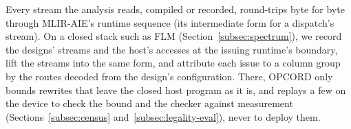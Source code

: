 \label{subsec:closed}
Every stream the analysis reads, compiled or recorded, round-trips byte for byte through MLIR-AIE's runtime sequence (its intermediate form for a dispatch's stream).
On a closed stack such as FLM (Section~\ref{subsec:spectrum}), we record the designs' streams and the host's accesses at the issuing runtime's boundary, lift the streams into the same form, and attribute each issue to a column group by the routes decoded from the design's configuration.
There, OPCORD only bounds rewrites that leave the closed host program as it is, and replays a few on the device to check the bound and the checker against measurement (Sections~\ref{subsec:census} and~\ref{subsec:legality-eval}), never to deploy them.

